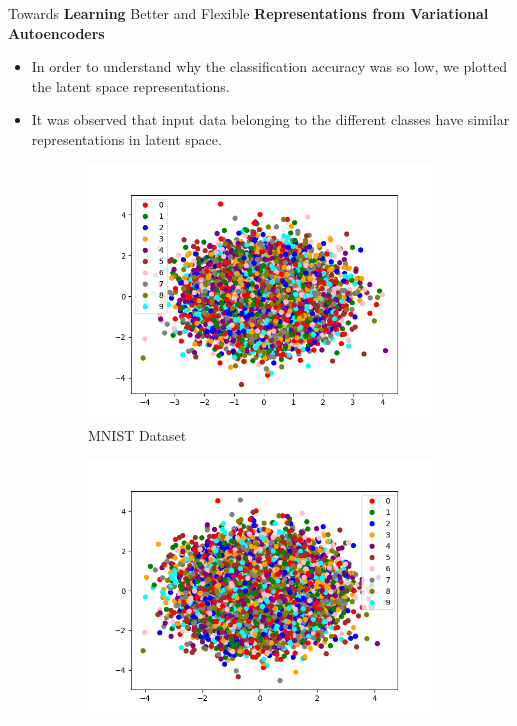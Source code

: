\documentclass[hyperref={colorlinks,citecolor=blue,linkcolor=blue,urlcolor=blue}]{beamer}
\begin{document}
\begin{frame}{ Towards \textbf{Learning} Better and Flexible \textbf{Representations from Variational Autoencoders} \vspace{0.3em}}
  \begin{itemize}
    \item In order to understand why the classification accuracy was so low, we plotted the latent space representations.
    \item It was observed that input data belonging to the different classes have similar representations in latent space.
  \end{itemize}
  \begin{figure}
    \captionsetup{justification=centering}
    \begin{subfigure}[b]{0.4\textwidth}
        \centering
        \includegraphics[width=\textwidth,]{./Images/latent_MNIST_VAE_Sampling.png}
        \caption{MNIST Dataset}
    \end{subfigure}
    \begin{subfigure}[b]{0.4\textwidth}
        \centering
        \includegraphics[width=\textwidth]{./Images/latent_FashionMNIST_VAE_Sampling.png}

\end{subfigure}
\end{figure}
\end{frame}
\end{document}
